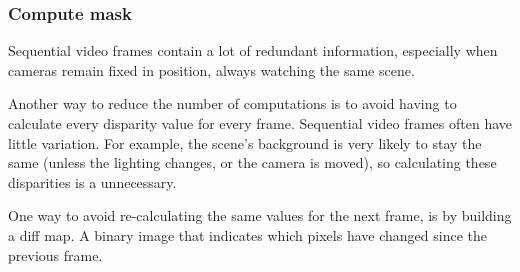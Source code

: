 \subsubsection{Compute mask}

Sequential video frames contain a lot of redundant information,
especially when cameras remain fixed in position, always watching the
same scene.

Another way to reduce the number of computations is to avoid having to
calculate every disparity value for every frame. Sequential video
frames often have little variation. For example, the scene's
background is very likely to stay the same (unless the lighting
changes, or the camera is moved), so calculating these disparities is
a unnecessary.

One way to avoid re-calculating the same values for the next frame, is
by building a diff map. A binary image that indicates which pixels
have changed since the previous frame.

